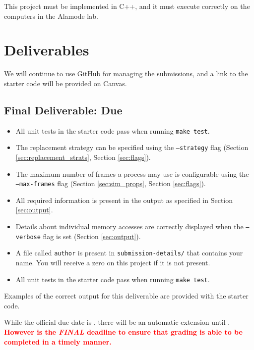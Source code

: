 \documentclass[10pt]{article}
\begin{document}
This project must be implemented in C++, and it must execute correctly on the computers in the Alamode lab.


\section{Deliverables}
\label{sec:deliverables}

We will continue to use GitHub for managing the submissions, and a link to the starter code will be provided on Canvas.

\subsection{Final Deliverable: Due \duedate}

\begin{itemize}
    \item All unit tests in the starter code pass when running \texttt{make test}.
    \item The replacement strategy can be specified using the \texttt{--strategy} flag (Section \ref{sec:replacement_strats}, Section \ref{sec:flags}).
    \item The maximum number of frames a process may use is configurable using the \texttt{--max-frames} flag (Section \ref{sec:sim_props}, Section \ref{sec:flags}).
    \item All required information is present in the output as specified in Section \ref{sec:output}.
    \item Details about individual memory accesses are correctly displayed when the \texttt{--verbose} flag is set (Section \ref{sec:output}).
    \item A file called \texttt{author} is present in \texttt{submission-details/} that contains your name. You will receive a zero on this project if it is not present.
    \item All unit tests in the starter code pass when running \texttt{make test}.
\end{itemize}

Examples of the correct output for this deliverable are provided with the starter code.

While the official due date is \duedate, there will be an automatic extension until \duedatefinal. \textcolor{red}{\textbf{However \duedatefinal{} is the \textit{FINAL} deadline to ensure that grading is able to be completed in a timely manner.}}
\end{document}
